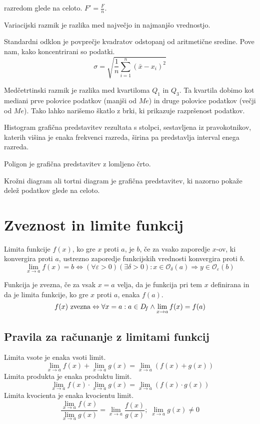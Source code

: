 \documentclass[a4paper,oneside,12pt,fleqn]{article}
\newcommand\krat\cdot
\renewcommand\implies\Rightarrow
\renewcommand\iff\Leftrightarrow
\numberwithin{equation}{section}
\newenvironment{description*}%
{
\vspace{-12pt}%
\begin{description}%
\setlength{\itemsep}{0pt}%
\setlength{\parskip}{2pt}}%
{\end{description}}
\begin{document}
\begin{description*}
    razredom glede na celoto. $F' = \frac{F}{n}$.
  \item[Variacijski razmik] je razlika med največjo in najmanjšo vrednostjo.
  \item[Standardni odklon] je povprečje kvadratov odstopanj od aritmetične sredine. Pove
    nam, kako koncentrirani so podatki.
    \[ \sigma = \sqrt{\frac{1}{n}\sum_{i=1}^n\left(\bar{x}-x_i\right)^2} \]
  \item[Medčetrtinski razmik] je razlika med kvartiloma $Q_1$ in $Q_3$. Ta kvartila dobimo
    kot mediani prve polovice podatkov (manjši od $Me$) in druge polovice podatkov
    (večji od $Me$). Tako lahko narišemo škatlo z brki, ki prikazuje razpršenost podatkov.
  \item[Histogram] grafična predstavitev rezultata s stolpci, sestavljena iz
    pravokotnikov, katerih višina je enaka frekvenci razreda, širina pa
    predstavlja interval enega razreda.
  \item[Poligon] je grafična predstavitev z lomljeno črto.
  \item[Krožni diagram] ali tortni diagram je grafična predstavitev, ki nazorno pokaže
    delež podatkov glede na celoto.
\end{description*}


\section{Zveznost in limite funkcij}
\label{sec:zvez}
Limita funkcije $f(x)$, ko gre $x$ proti $a$, je $b$, če za vsako zaporedje $x$-ov, ki
konvergira proti $a$, ustrezno zaporedje funkcijskih vrednosti konvergira proti $b$.
\[ \lim_{x\rightarrow a} f(x) = b \iff (\forall\varepsilon>0)(\exists\delta>0): x \in
\mathcal{O}_\delta(a) \implies y \in \mathcal{O}_\varepsilon(b) \]

Funkcija je zvezna, če za vsak $x = a$ velja, da je funkcija pri tem $x$ definirana in da je
limita funkcije, ko gre $x$ proti $a$, enaka $f(a)$.
\[ f(x) \textnormal{ zvezna} \iff \forall x = a: a \in D_{\!f} \land \lim_{x\rightarrow a} f(x) = f(a) \]

\subsection{Pravila za računanje z limitami funkcij}
\label{sec:zvez:prav}
Limita vsote je enaka vsoti limit.
\[ \lim_{x\rightarrow a}f(x) + \lim_{x\rightarrow a}g(x) = \lim_{x\rightarrow a}
\left(f(x)+g(x)\right) \]
Limita produkta je enaka produktu limit.
\[ \lim_{x\rightarrow a}f(x) \krat \lim_{x\rightarrow a}g(x) = \lim_{x\rightarrow a}
\left(f(x)\krat g(x)\right) \]
Limita kvocienta je enaka kvocientu limit.
\[ \frac{\displaystyle \lim_{x\rightarrow a}f(x)}{\displaystyle \lim_{x\rightarrow a}g(x)} = \lim_{x\rightarrow a}
\frac{f(x)}{g(x)}; \; \lim_{x\rightarrow a} g(x) \neq 0 \]
\end{document}
